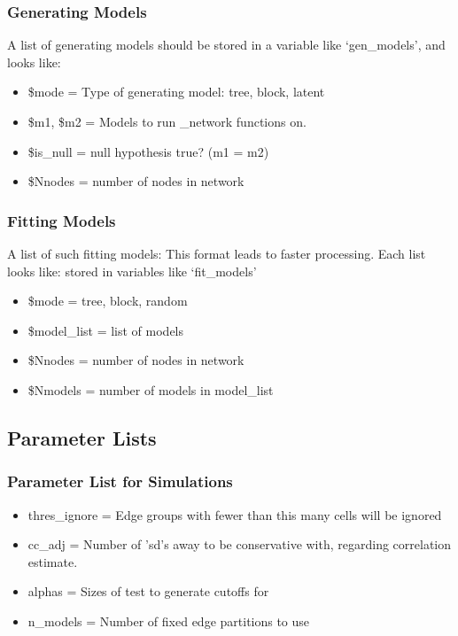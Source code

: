 \documentclass[11pt]{article}
\begin{document}
\subsubsection{Generating Models}
A list of generating models should be stored in a variable like `gen\_models', and looks like: 
\begin{itemize}
\item \$mode = Type of generating model: tree, block, latent
\item \$m1, \$m2 = Models to run \_network functions on. 
\item \$is\_null = null hypothesis true? (m1 = m2)
\item \$Nnodes = number of nodes in network 
\end{itemize}

\subsubsection{Fitting Models}
A list of such fitting models: This format leads to faster processing. Each list looks like: stored in variables like `fit\_models'
\begin{itemize}


\item \$mode = tree, block, random
\item \$model\_list = list of models
\item \$Nnodes  = number of nodes in network
\item \$Nmodels = number of models in model\_list
\end{itemize}

\subsection{Parameter Lists}
\subsubsection{Parameter List for Simulations}
\begin{itemize}
\item thres\_ignore = Edge groups with fewer than this many cells will be ignored
\item cc\_adj = Number of 'sd's away to be conservative with, regarding correlation estimate. 
\item alphas = Sizes of test to generate cutoffs for
\item n\_models = Number of fixed edge partitions to use

\end{itemize}
\end{document}
